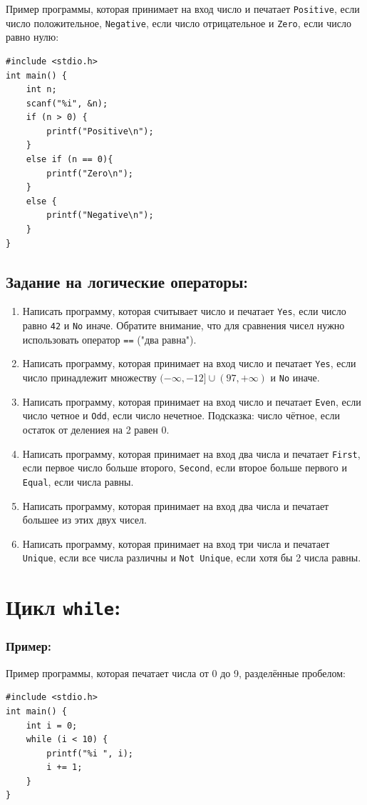 \documentclass{article}
\begin{document}
Пример программы, которая принимает на вход число и печатает \texttt{Positive}, если число положительное, \texttt{Negative}, если число отрицательное и \texttt{Zero}, если число равно нулю:
\begin{lstlisting}
#include <stdio.h>
int main() {
    int n;
    scanf("%i", &n);
    if (n > 0) {
       	printf("Positive\n");
    }
    else if (n == 0){
    	printf("Zero\n");
    }
    else {
    	printf("Negative\n");
    }
}
\end{lstlisting}


\newpage
\subsection*{Задание на логические операторы:}
\begin{enumerate}
\item Написать программу, которая считывает число и печатает \texttt{Yes}, если число равно \texttt{42} и \texttt{No} иначе. Обратите внимание, что для сравнения чисел нужно использовать оператор \texttt{==} ("два равна").
\item Написать программу, которая принимает на вход число и печатает \texttt{Yes}, если число принадлежит множеству $(-\infty, -12] \cup (97, +\infty)$  и \texttt{No} иначе.
\item Написать программу, которая принимает на вход число и печатает \texttt{Even}, если число четное и \texttt{Odd}, если число нечетное. Подсказка: число чётное, если остаток от делениея на 2 равен 0.
\item Написать программу, которая принимает на вход два числа и печатает \texttt{First}, если первое число больше второго, \texttt{Second}, если второе больше первого и \texttt{Equal}, если числа равны.
\item Написать программу, которая принимает на вход два числа и печатает большее из этих двух чисел.
\item Написать программу, которая принимает на вход три числа и печатает \texttt{Unique}, если все числа различны и \texttt{Not Unique}, если хотя бы 2 числа равны.
\end{enumerate}

\section*{Цикл \texttt{while}:}
\subsubsection*{Пример:}
Пример программы, которая печатает числа от 0 до 9, разделённые пробелом:
\begin{lstlisting}
#include <stdio.h>
int main() {
    int i = 0;
    while (i < 10) {
        printf("%i ", i);
        i += 1;
    }
}
\end{lstlisting}
\end{document}
